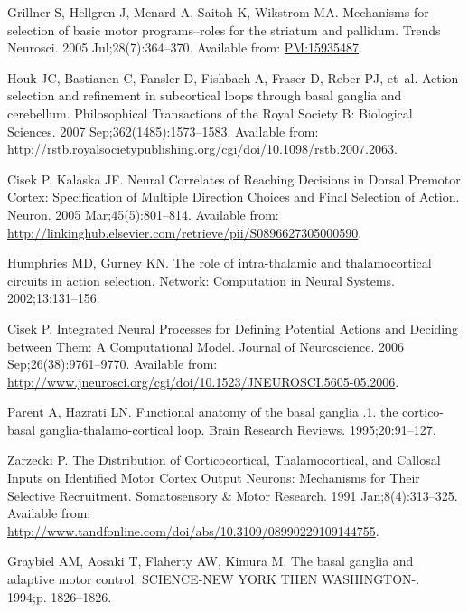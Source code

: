 \documentclass[10pt,letterpaper]{article}
\begin{document}
\begin{thebibliography}{10}
Grillner S, Hellgren J, Menard A, Saitoh K, Wikstrom MA.
\newblock Mechanisms for selection of basic motor programs–roles for the
  striatum and pallidum.
\newblock Trends Neurosci. 2005 Jul;28(7):364--370.
\newblock Available from: \url{PM:15935487}.

Houk JC, Bastianen C, Fansler D, Fishbach A, Fraser D, Reber PJ, et~al.
\newblock Action selection and refinement in subcortical loops through basal
  ganglia and cerebellum.
\newblock Philosophical Transactions of the Royal Society B: Biological
  Sciences. 2007 Sep;362(1485):1573--1583.
\newblock Available from:
  \url{http://rstb.royalsocietypublishing.org/cgi/doi/10.1098/rstb.2007.2063}.

Cisek P, Kalaska JF.
\newblock Neural {Correlates} of {Reaching} {Decisions} in {Dorsal} {Premotor}
  {Cortex}: {Specification} of {Multiple} {Direction} {Choices} and {Final}
  {Selection} of {Action}.
\newblock Neuron. 2005 Mar;45(5):801--814.
\newblock Available from:
  \url{http://linkinghub.elsevier.com/retrieve/pii/S0896627305000590}.

Humphries MD, Gurney KN.
\newblock The role of intra-thalamic and thalamocortical circuits in action
  selection.
\newblock Network: Computation in Neural Systems. 2002;13:131--156.

Cisek P.
\newblock Integrated {Neural} {Processes} for {Defining} {Potential} {Actions}
  and {Deciding} between {Them}: {A} {Computational} {Model}.
\newblock Journal of Neuroscience. 2006 Sep;26(38):9761--9770.
\newblock Available from:
  \url{http://www.jneurosci.org/cgi/doi/10.1523/JNEUROSCI.5605-05.2006}.

Parent A, Hazrati LN.
\newblock Functional anatomy of the basal ganglia .1. the cortico-basal
  ganglia-thalamo-cortical loop.
\newblock Brain Research Reviews. 1995;20:91--127.

Zarzecki P.
\newblock The {Distribution} of {Corticocortical}, {Thalamocortical}, and
  {Callosal} {Inputs} on {Identified} {Motor} {Cortex} {Output} {Neurons}:
  {Mechanisms} for {Their} {Selective} {Recruitment}.
\newblock Somatosensory \& Motor Research. 1991 Jan;8(4):313--325.
\newblock Available from:
  \url{http://www.tandfonline.com/doi/abs/10.3109/08990229109144755}.

Graybiel AM, Aosaki T, Flaherty AW, Kimura M.
\newblock The basal ganglia and adaptive motor control.
\newblock SCIENCE-NEW YORK THEN WASHINGTON-. 1994;p. 1826--1826.


\end{thebibliography}
\end{document}
